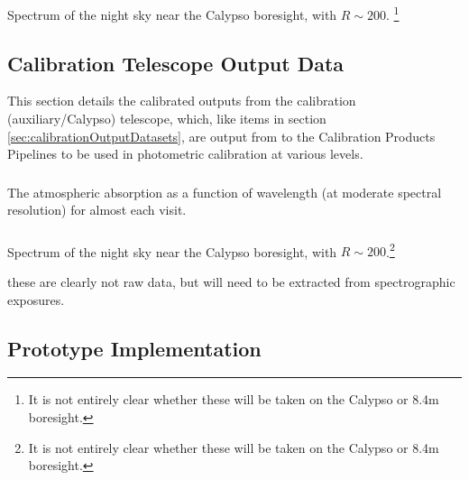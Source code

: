 \subsubsection{}\label{calypso:nightSkySpectrum} Spectrum of the night sky near the Calypso boresight, with $R \sim 200$. \footnote{It is not entirely clear whether these will be taken on the Calypso or 8.4m	boresight.}






\subsection{Calibration Telescope Output Data}
\label{sec:calibrationTelescopeDatasets}
This section details the calibrated outputs from the calibration (auxiliary/Calypso) telescope, which, like items in section \ref{sec:calibrationOutputDatasets}, are output from to the Calibration Products Pipelines to be used in photometric calibration at various levels.


\subsubsection{}\label{calypso:atmosphericAbsorption}
The atmospheric absorption as a function of wavelength (at moderate spectral resolution) for almost each visit.
 
\subsubsection{}\label{calypso:nightSkySpectrum}
Spectrum of the night sky near the Calypso boresight, with $R \sim 200$.\footnote{It is not entirely clear whether these will be taken on the Calypso or 8.4m boresight.}

\Nb these are clearly not raw data, but will need to be extracted from spectrographic exposures.




\subsection{Prototype Implementation}

